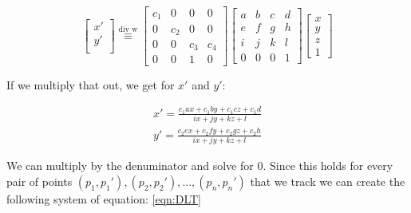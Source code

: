 \documentclass[conference]{IEEEtran}
\begin{document}
\begin{equation*}
    \begin{bmatrix}
        x' \\
        y' \\
    \end{bmatrix}
    \overset{\text{div w}}{\equiv}
    \begin{bmatrix}
        c_1 & 0   & 0   & 0   \\
        0   & c_2 & 0   & 0   \\
        0   & 0   & c_3 & c_4 \\
        0   & 0   & 1   & 0
    \end{bmatrix}
    \begin{bmatrix}
        a & b & c & d \\
        e & f & g & h \\
        i & j & k & l \\
        0 & 0 & 0 & 1
    \end{bmatrix}
    \begin{bmatrix}
        x \\
        y \\
        z \\
        1
    \end{bmatrix}
\end{equation*}

If we multiply that out, we get for $x'$ and $y'$:

\begin{gather*}
    x' = \frac{c_1 a x + c_1 b y + c_1 c z + c_1 d}{ix + jy + kz + l} \\
    y' = \frac{c_2 e x + c_2 f y + c_2 g z + c_2 h}{ix + jy + kz + l}
\end{gather*}

We can multiply by the denuminator and solve for 0. Since this holds for every pair of points $(p_{1} , p_{1}'), (p_{2} , p_{2}'), ..., (p_{n}, p_{n}')$ that we track we can create the following system of equation:
\ref{eqn:DLT}




\end{document}
